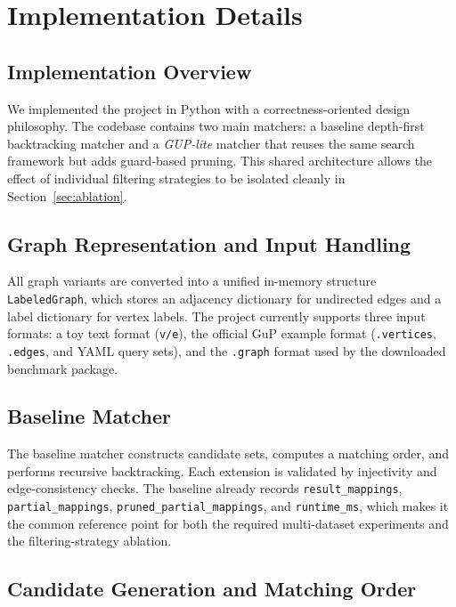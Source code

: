 \section{Implementation Details}
\label{sec:impl-details}

\subsection{Implementation Overview}

We implemented the project in Python with a correctness-oriented design philosophy. The codebase contains two main matchers: a baseline depth-first backtracking matcher and a \emph{GUP-lite} matcher that reuses the same search framework but adds guard-based pruning. This shared architecture allows the effect of individual filtering strategies to be isolated cleanly in Section~\ref{sec:ablation}.

\subsection{Graph Representation and Input Handling}

All graph variants are converted into a unified in-memory structure \texttt{LabeledGraph}, which stores an adjacency dictionary for undirected edges and a label dictionary for vertex labels. The project currently supports three input formats: a toy text format (\texttt{v/e}), the official GuP example format (\texttt{.vertices}, \texttt{.edges}, and YAML query sets), and the \texttt{.graph} format used by the downloaded benchmark package.

\subsection{Baseline Matcher}

The baseline matcher constructs candidate sets, computes a matching order, and performs recursive backtracking. Each extension is validated by injectivity and edge-consistency checks. The baseline already records \texttt{result\_mappings}, \texttt{partial\_mappings}, \texttt{pruned\_partial\_mappings}, and \texttt{runtime\_ms}, which makes it the common reference point for both the required multi-dataset experiments and the filtering-strategy ablation.

\subsection{Candidate Generation and Matching Order}


